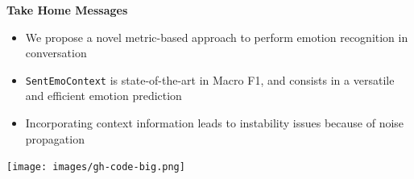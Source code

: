 \documentclass[final,hyperref={pdfpagelabels=false},unknownkeysallowed]{beamer} %
\begin{document}
\begin{frame}
\begin{minipage}{\textwidth}
  \begin{alertblock}{\textbf{Take Home Messages}}
  \begin{minipage}{0.75\textwidth}
    \begin{itemize}
      \item \enspace We propose a novel metric-based approach to perform emotion recognition in conversation
      \item \enspace \texttt{SentEmoContext} is state-of-the-art in Macro F1, and consists in a versatile and efficient emotion prediction 
      \item \enspace Incorporating context information leads to instability issues because of noise propagation
      \end{itemize}
  \end{minipage}
  \begin{minipage}{0.23\textwidth}
    \centering
    \texttt{[image: images/gh-code-big.png]}
  \end{minipage}
\end{alertblock}
\end{minipage}


\end{frame}     
\end{document}
